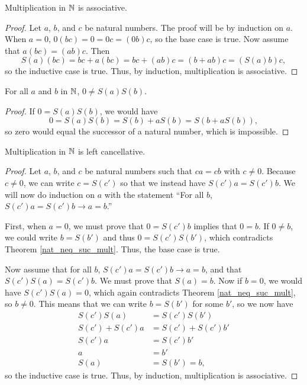 \documentclass[../../math.tex]{subfiles}
\begin{document}
\begin{instance}
    Multiplication in $\mathbb{N}$ is associative.
\end{instance}
\begin{proof}
    Let $a$, $b$, and $c$ be natural numbers.  The proof will be by induction on
    $a$.  When $a = 0$, $0(bc) = 0 = 0c = (0b)c$, so the base case is true.  Now
    assume that $a(bc) = (ab)c$.  Then
    \[
        S(a)(bc) = bc + a(bc) = bc + (ab)c = (b + ab)c = (S(a)b)c,
    \]
    so the inductive case is true.  Thus, by induction, multiplication is
    associative.
\end{proof}

\begin{theorem} \label{nat_neq_suc_mult}
    For all $a$ and $b$ in $\mathbb{N}$, $0 \neq S(a)S(b)$.
\end{theorem}
\begin{proof}
    If $0 = S(a)S(b)$, we would have
    \[
        0 = S(a)S(b) = S(b) + aS(b) = S(b + aS(b)),
    \]
    so zero would equal the successor of a natural number, which is impossible.
\end{proof}

\begin{instance}
    Multiplication in $\mathbb{N}$ is left cancellative.
\end{instance}
\begin{proof}
    Let $a$, $b$, and $c$ be natural numbers such that $ca = cb$ with $c \neq
    0$.  Because $c \neq 0$, we can write $c = S(c')$ so that we instead have
    $S(c')a = S(c')b$.  We will now do induction on $a$ with the statement ``For
    all $b$, $S(c')a = S(c')b \rightarrow a = b$.''

    First, when $a = 0$, we must prove that $0 = S(c')b$ implies that $0 = b$.
    If $0 \neq b$, we could write $b = S(b')$ and thus $0 = S(c')S(b')$, which
    contradicts Theorem \ref{nat_neq_suc_mult}.  Thus, the base case is true.

    Now assume that for all $b$, $S(c')a = S(c')b \rightarrow a = b$, and that
    $S(c')S(a) = S(c')b$.  We must prove that $S(a) = b$.  Now if $b = 0$, we
    would have $S(c')S(a) = 0$, which again contradicts Theorem
    \ref{nat_neq_suc_mult}, so $b \neq 0$.  This means that we can write $b =
    S(b')$ for some $b'$, so we now have
    \begin{align*}
        S(c')S(a) &= S(c')S(b') \\
        S(c') + S(c')a &= S(c') + S(c')b' \\
        S(c')a &= S(c')b' \\
        a &= b' \\
        S(a) &= S(b') = b,
    \end{align*}
    so the inductive case is true.  Thus, by induction, multiplication is
    associative.
\end{proof}
\end{document}
